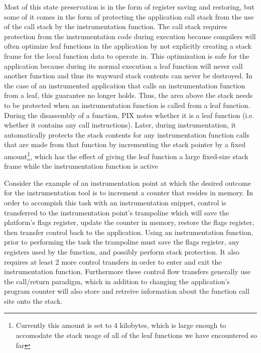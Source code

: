 Most of this state preservation is in the form of register saving and restoring, but 
some of it comes in the form of protecting the application call stack from the use of
the call stack by the instrumentation function. The call stack requires protection from the 
instrumentation code during execution because compilers will often optimize leaf functions in the application
by not explicitly creating a stack frame for the local function data to operate in. This optimization is safe for the application because during its
normal execution a leaf function will never call another function and thus its wayward stack contents 
can never be destroyed. In the case of an instrumented
application that calls an instrumentation function from a leaf, this guarantee no longer holds. Thus, the area above the stack needs to be protected when
an instrumentation function is called from a leaf function. During the disassembly 
of a function, PIX notes whether it is a leaf function (i.e. whether it contains any call
instructions). Later, during instrumentation, it automatically protects the stack contents 
for any instrumentation function calls that are made from that function by
incrementing the stack pointer by a fixed amount\footnote{Currently this amount is
set to 4 kilobytes, which is large enough to accomodate the stack usage of all
of the leaf functions we have encountered so far}, which has the effect of giving 
the leaf function a large fixed-size stack frame while the instrumentation
function is active

Consider the example of an instrumentation point at which the desired outcome 
for the instrumentation tool is to increment a counter that resides in memory. 
In order to accompish this task with an instrumentation snippet, control is transferred to the
instrumentation point's trampoline which will save the platform's flags register, update the counter in memory, restore
the flags register, then transfer control back to the application. Using an instrumentation function, prior to performing
the task the trampoline must save the flags register, any registers used by the function, and
possibly perform stack protection.
It also requires at least 2 more control transfers in order to enter and exit the instrumentation function. 
Furthermore these control flow transfers generally use the call/return paradigm, which in addition to changing the
application's program counter will also store and retreive information about the function call site onto the stack. 

